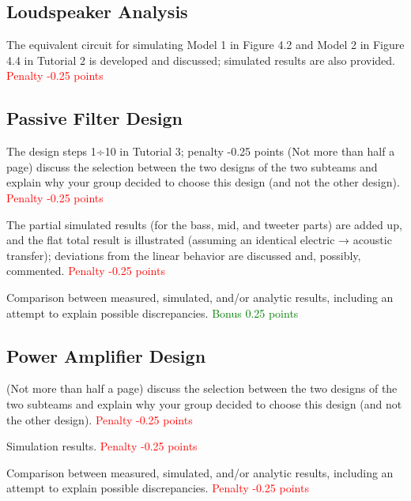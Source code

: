 \subsection{Loudspeaker Analysis}
The equivalent circuit for simulating Model 1 in Figure 4.2 and Model 2 in Figure 4.4 in Tutorial 2 is developed and discussed; simulated results are also provided. \textcolor{red}{Penalty -0.25 points}

\subsection{Passive Filter Design}
The design steps 1÷10 in Tutorial 3; penalty -0.25 points
(Not more than half a page) discuss the selection between the two designs of the two subteams and explain why your group decided to choose this design (and not the other design). \textcolor{red}{Penalty -0.25 points}

The partial simulated results (for the bass, mid, and tweeter parts) are added up, and the flat total result is illustrated (assuming an identical electric → acoustic transfer); deviations from the linear behavior are discussed and, possibly, commented. \textcolor{red}{Penalty -0.25 points}

Comparison between measured, simulated, and/or analytic results, including an attempt to explain possible discrepancies. \textcolor{Green}{Bonus 0.25 points}

\subsection{Power Amplifier Design}
(Not more than half a page) discuss the selection between the two designs of the two subteams and explain why your group decided to choose this design (and not the other design). \textcolor{red}{Penalty -0.25 points}

Simulation results. \textcolor{red}{Penalty -0.25 points}

Comparison between measured, simulated, and/or analytic results, including an attempt to explain possible discrepancies. \textcolor{red}{Penalty -0.25 points}